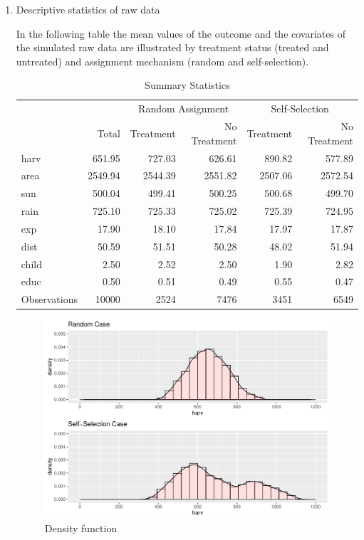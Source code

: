\begin{enumerate}
\item Descriptive statistics of raw data

In the following table the mean values of the outcome and the covariates of the simulated raw data are illustrated by treatment status (treated and untreated) and assignment mechanism (random and self-selection). %

\begin{table}[ht]
\centering
\begin{threeparttable}
\caption{Summary Statistics} \label{tab:data}
\begin{tabular}{lrrrrr}
  \hline
  & &\multicolumn{2}{c}{Random Assignment} & \multicolumn{2}{c}{Self-Selection}\\
 & Total & Treatment & No Treatment & Treatment & No Treatment \\
 \hline
harv & 651.95 & 727.03 & 626.61 & 890.82 & 577.89 \\ 
  area & 2549.94 & 2544.39 & 2551.82 & 2507.06 & 2572.54 \\ 
  sun & 500.04 & 499.41 & 500.25 & 500.68 & 499.70 \\ 
  rain & 725.10 & 725.33 & 725.02 & 725.39 & 724.95 \\ 
  exp & 17.90 & 18.10 & 17.84 & 17.97 & 17.87 \\ 
  dist & 50.59 & 51.51 & 50.28 & 48.02 & 51.94 \\ 
  child & 2.50 & 2.52 & 2.50 & 1.90 & 2.82 \\ 
  educ & 0.50 & 0.51 & 0.49 & 0.55 & 0.47 \\ 
  Observations & 10000 & 2524 & 7476 & 3451 & 6549 \\ 
   \hline
\end{tabular}
\end{threeparttable}
\end{table}

\begin{figure}[htb]
\begin{raggedleft}
\includegraphics[width=\linewidth]{../figures/density_total.pdf}
\caption{Density function}
\label{fig:density}
\end{raggedleft}
\end{figure}


\end{enumerate}

